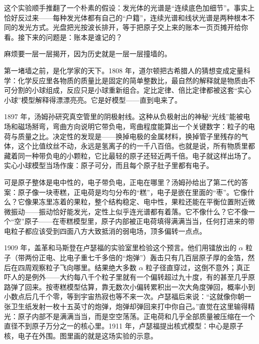 \begin{mainline}
这个实验顺手推翻了一个朴素的假设：发光体的光谱是“连续底色加细节”。事实上恰好反过来——每种发光体都有自己的“户籍”，连续光谱和线状光谱是两种根本不同的发光方式。光盘把光按波长排开，等于把原子交上来的账本一页页摊开给你看。接下来的问题是：账本是谁记的？
\end{mainline}


\begin{mainline}
麻烦要一层一层揭开，因为历史就是一层一层撞墙的。

第一堵墙之前，是化学家的天下。1808 年，道尔顿把古希腊人的猜想变成定量科学：化学反应里各物质的质量比是固定的简单整数比，最自然的解释就是物质由不可分割的小球组成，反应只是小球重新组合。定比定律、倍比定律都被这套“实心小球”模型解释得漂漂亮亮。它是好模型——直到电来了。

1897 年，汤姆孙研究真空管里的阴极射线。这种从负极射出的神秘“光线”能被电场和磁场掰弯，弯曲方向说明它带负电，弯曲程度能算出一个关键数字：粒子的电荷与质量之比。决定性的发现是——换掉电极的金属材料，换掉管子里残存的气体，这个比值纹丝不动，永远是氢离子的约一千八百倍。也就是说，所有物质里都藏着同一种带负电的小颗粒，它比最轻的原子还轻近两千倍。电子就这样出场了。实心小球模型当场作废：原子可分，而且每个原子肚子里都有电子。

可是原子整体是电中性的，电子带负电，正电在哪里？汤姆孙给出了第二代的答案：原子像一块枣糕，正电荷是均匀分布的“糕”，电子是嵌在里面的“枣”。它像什么？它像果冻里冻着的果粒，整个结构稳定、电中性，果粒还能在平衡位置附近微微振动——振动恰好能发光，定性上似乎连光谱都有着落。它不像什么？它不像一个“空”原子——在枣糕模型里，原子内部被正电荷填得满满当当，任何打进来的带电粒子都应该受到四面八方大致抵消的弱电场，顶多偏转一点点。

1909 年，盖革和马斯登在卢瑟福的实验室里检验这个预言。他们用镭放出的 \(\alpha\) 粒子（带两份正电、比电子重七千多倍的“炮弹”）轰击只有几百层原子厚的金箔，然后在四周观察粒子飞向哪里。结果绝大多数 \(\alpha\) 粒子径直穿过，这倒不意外；真正吓人的是例外——大约每八千个粒子里就有一个偏转超过九十度，有的甚至几乎原路弹了回来。按枣糕模型估算，靠无数次小偏转累积出一次大角度弹回，概率小到小数点后几千个零，等到宇宙热寂也等不来一次。卢瑟福后来说：“这就像你朝一张卫生纸发射一枚十五英寸的炮弹，炮弹却弹回来打中你自己。”直觉在这里输得精光：原子内部不是满满当当，而是空空荡荡。正电荷和几乎全部质量被压缩在一个直径不到原子万分之一的核心里。1911 年，卢瑟福提出核式模型：中心是原子核，电子在外围。图里画的就是这场实验的示意。
\end{mainline}

